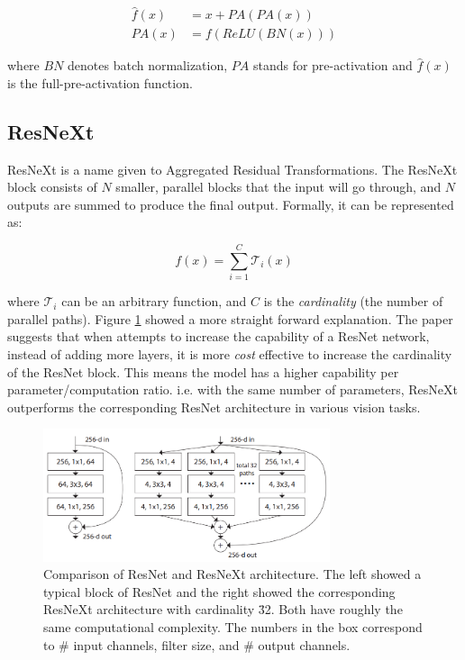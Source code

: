 \begin{align}
    \hat{f}(x) &= x + PA(PA(x))\\
    PA(x) &= f(ReLU(BN(x)))
\end{align}


where $BN$ denotes batch normalization, $PA$ stands for pre-activation and $\hat{f}(x)$ is the full-pre-activation function. 


\subsection{ResNeXt}
ResNeXt is a name given to Aggregated Residual Transformations\cite{xieAggregatedResidualTransformations2017a}. The ResNeXt block consists of $N$ smaller, parallel blocks that the input will go through, and $N$ outputs are summed to produce the final output. Formally, it can be represented as:

$$
f(x)=\sum^{C}_{i=1} \mathcal{T}_i(x)
$$

where $\mathcal{T}_i$ can be an arbitrary function, and $C$ is the \textit{cardinality} (the number of parallel paths). Figure \ref{fig:resnet_resnext_cmp} showed a more straight forward explanation. The paper suggests that when attempts to increase the capability of a ResNet network, instead of adding more layers, it is more \textit{cost} effective to increase the cardinality of the ResNet block. This means the model has a higher capability per parameter/computation ratio. i.e. with the same number of parameters, ResNeXt outperforms the corresponding ResNet architecture in various vision tasks.

\begin{figure}
    \centering
    \includegraphics[width=0.75\textwidth]{images/preliminary/resnet_resnext_cmp.png}
    \caption[Comparison of ResNet and ResNeXt architecture.]{Comparison of ResNet and ResNeXt architecture. The left showed a typical block of ResNet and the right showed the corresponding ResNeXt architecture with cardinality \= 32. Both have roughly the same computational complexity. The numbers in the box correspond to \# input channels, filter size, and \# output channels.\cite{xieAggregatedResidualTransformations2017a}} 
    \label{fig:resnet_resnext_cmp}
\end{figure}

